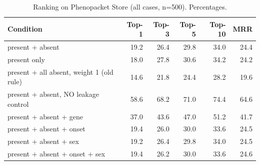 \begin{table}[t]
\centering\small
\begin{tabular}{lrrrrr}
\toprule
Condition & Top-1 & Top-3 & Top-5 & Top-10 & MRR \\
\midrule
present + absent & 19.2 & 26.4 & 29.8 & 34.0 & 24.4 \\
present only & 18.0 & 27.8 & 30.6 & 34.2 & 24.2 \\
present + all absent, weight 1 (old rule) & 14.6 & 21.8 & 24.4 & 28.2 & 19.6 \\
present + absent, NO leakage control & 58.6 & 68.2 & 71.0 & 74.4 & 64.6 \\
present + absent + gene & 37.0 & 43.6 & 47.0 & 51.2 & 41.7 \\
present + absent + onset & 19.4 & 26.0 & 30.0 & 33.6 & 24.5 \\
present + absent + sex & 19.2 & 26.4 & 29.8 & 34.0 & 24.5 \\
present + absent + onset + sex & 19.4 & 26.2 & 30.0 & 33.6 & 24.6 \\
\bottomrule
\end{tabular}
\caption{Ranking on Phenopacket Store (all cases, n=500). Percentages.}
\label{tab:rank-main}
\end{table}
